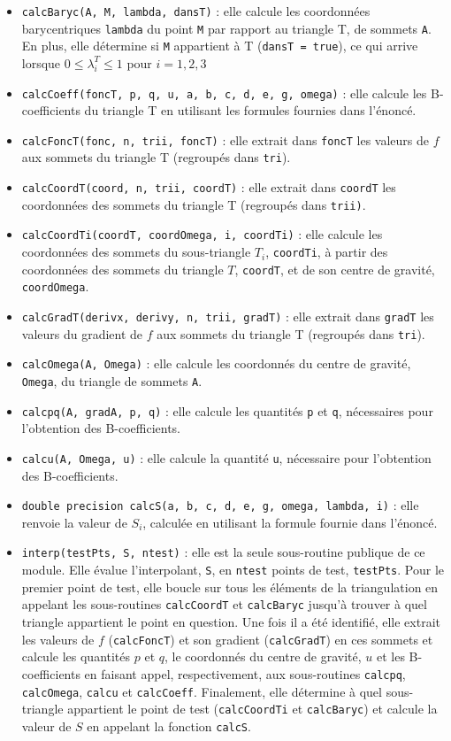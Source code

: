 \documentclass[12 pt]{article}
\begin{document}
\begin{itemize}
	\item \texttt{calcBaryc(A, M, lambda, dansT)} : elle calcule les coordonnées barycentriques \texttt{lambda} du point \texttt{M} par rapport au triangle T, de sommets \texttt{A}. En plus, elle détermine si \texttt{M} appartient à T (\texttt{dansT = true}), ce qui arrive lorsque $ 0 \leq \lambda_i^T \leq 1$ pour $i = 1, 2, 3$ 
	\item \texttt{calcCoeff(foncT, p, q, u, a, b, c, d, e, g, omega)} : elle calcule les B-coefficients du triangle T en utilisant les formules fournies dans l'énoncé.
	\item \texttt{calcFoncT(fonc, n, trii, foncT)} : elle extrait dans \texttt{foncT} les valeurs de $f$ aux sommets du triangle T (regroupés dans \texttt{tri}).
	\item \texttt{calcCoordT(coord, n, trii, coordT)} : elle extrait dans \texttt{coordT} les coordonnées des sommets du triangle T (regroupés dans \texttt{trii)}.
	\item \texttt{calcCoordTi(coordT, coordOmega, i, coordTi)} : elle calcule les coordonnées des sommets du sous-triangle $T_i$, \texttt{coordTi}, à partir des coordonnées des sommets du triangle $T$, \texttt{coordT}, et de son centre de gravité, \texttt{coordOmega}.
	\item \texttt{calcGradT(derivx, derivy, n, trii, gradT)} : elle extrait dans \texttt{gradT} les valeurs du gradient de $f$ aux sommets du triangle T (regroupés dans \texttt{tri}).
	\item \texttt{calcOmega(A, Omega)} : elle calcule les coordonnés du centre de gravité, \texttt{Omega}, du triangle de sommets \texttt{A}.
	\item \texttt{calcpq(A, gradA, p, q)} : elle calcule les quantités \texttt{p} et \texttt{q}, nécessaires pour l'obtention des B-coefficients.
	\item \texttt{calcu(A, Omega, u)} : elle calcule la quantité \texttt{u}, nécessaire pour l'obtention des B-coefficients.
	\item \texttt{double precision calcS(a, b, c, d, e, g, omega, lambda, i)} : elle renvoie la valeur de $S_i$, calculée en utilisant la formule fournie dans l'énoncé.
	\item \texttt{interp(testPts, S, ntest)} : elle est la seule sous-routine publique de ce module. Elle évalue l'interpolant, \texttt{S}, en \texttt{ntest} points de test, \texttt{testPts}. Pour le premier point de test, elle boucle sur tous les éléments de la triangulation en appelant les sous-routines \texttt{calcCoordT} et \texttt{calcBaryc} jusqu'à trouver à quel triangle appartient le point en question. Une fois il a été identifié, elle extrait les valeurs de $f$ (\texttt{calcFoncT}) et son gradient (\texttt{calcGradT}) en ces sommets et calcule les quantités $p$ et $q$, le coordonnés du centre de gravité, $u$ et les B-coefficients en faisant appel, respectivement, aux sous-routines \texttt{calcpq}, \texttt{calcOmega}, \texttt{calcu} et \texttt{calcCoeff}. Finalement, elle détermine à quel sous-triangle appartient le point de test (\texttt{calcCoordTi} et \texttt{calcBaryc}) et calcule la valeur de $S$ en appelant la fonction \texttt{calcS}.
	

\end{itemize}
\end{document}
